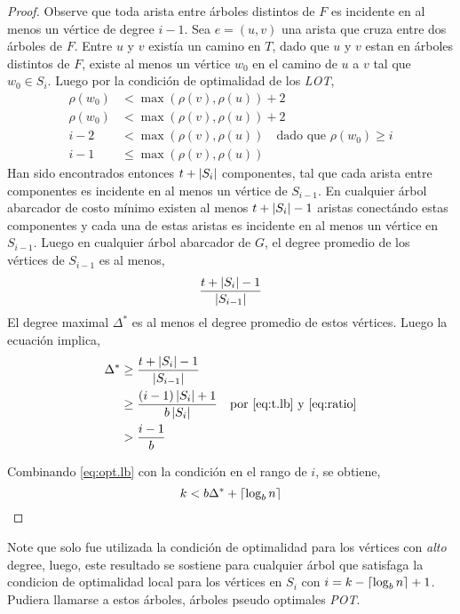 \documentclass[../np-approximations.tex]{subfiles}
\begin{document}
\begin{proof}
	Observe que toda arista entre árboles distintos de $F$ es 
	incidente en al menos un vértice de degree $i-1$. Sea $e=(u,v)$ 
	una arista que cruza entre dos árboles de $F$. Entre $u$ y $v$ 
	existía un camino en $T$, dado que $u$ y $v$ estan en árboles 
	distintos de $F$, existe al menos un vértice $w_0$ en el camino 
	de $u$ a $v$ tal que $w_0 \in S_i$. Luego por la condición de 
	optimalidad de los \emph{LOT},
	\begin{equation}
		\begin{split}
			\rho(w_0) & < \max(\rho(v),\rho(u)) + 2 \\
			\rho(w_0) & < \max(\rho(v),\rho(u)) + 2 \\
			i - 2     & < \max(\rho(v),\rho(u))     
			\quad \text{dado que $\rho(w_0) \ge i$} \\
			i-1       & \le \max(\rho(v),\rho(u))   
		\end{split}
	\end{equation}
	Han sido encontrados entonces $t+\left \vert S_i \right \vert$ componentes, tal 
	que cada arista entre componentes es incidente en al menos un 
	vértice de $S_{i-1}$. En cualquier árbol abarcador de costo 
	mínimo existen al menos $t+\left \vert S_i \right \vert-1$ aristas conectándo 
	estas componentes y cada una de estas aristas es incidente en 
	al menos un vértice en $S_{i-1}$. Luego en cualquier árbol 
	abarcador de $G$, el degree promedio de los vértices de
	$S_{i-1}$ es al menos,
	\begin{equation}
		\frac{t+\left \vert S_i \right \vert-1}{\left \vert S_{i-1} \right \vert}
	\end{equation}
	El degree maximal $\Delta^*$ es al menos el degree promedio de 
	estos vértices. Luego la ecuación  implica,
	\begin{equation}
		\label{eq:opt.lb}
		\begin{split}
			\Delta^* & \ge \frac{t+\left \vert S_i \right \vert-1}{\left \vert S_{i-1} \right \vert}   \\
			& \ge \frac{(i-1)\left \vert S_i \right \vert + 1}{b\left \vert S_i \right \vert} 
			\quad \text{por \eqref{eq:t.lb} y \eqref{eq:ratio}}\\
			& > \frac{i-1}{b}                         
		\end{split}
	\end{equation}
																                                    
	Combinando \eqref{eq:opt.lb} con la condición en el rango de 
	$i$, se obtiene,
	$$k < b\Delta^*+\left \lceil \log_b n \right \rceil$$
\end{proof}

Note que solo fue utilizada la condición de optimalidad para los 
vértices con \emph{alto} degree, luego, este resultado se sostiene 
para cualquier árbol que satisfaga la condicion de optimalidad 
local para los vértices en $S_i$ con $i = k - \left \lceil \log_b n \right \rceil + 1$.
Pudiera llamarse a estos árboles, árboles pseudo optimales
\emph{POT}.
\end{document}
